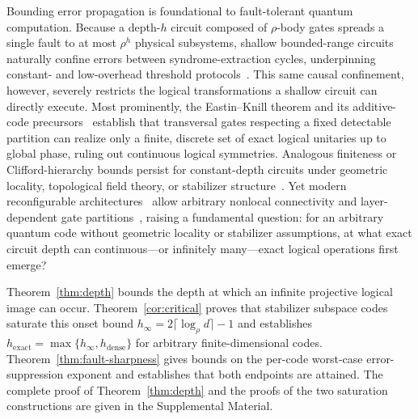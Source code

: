 \documentclass[aps,prl,reprint,notitlepage,nofootinbib,nobibnotes]{revtex4-2}
\begin{document}
Bounding error propagation is foundational to fault-tolerant quantum computation. Because a depth-\(h\) circuit composed of \(\rho\)-body gates spreads a single fault to at most \(\rho^h\) physical subsystems, shallow bounded-range circuits naturally confine errors between syndrome-extraction cycles, underpinning constant- and low-overhead threshold protocols~\cite{Gottesman,BravyiMemory}. This same causal confinement, however, severely restricts the logical transformations a shallow circuit can directly execute. Most prominently, the Eastin--Knill theorem and its additive-code precursors~\cite{Zeng,EK} establish that transversal gates respecting a fixed detectable partition can realize only a finite, discrete set of exact logical unitaries up to global phase, ruling out continuous logical symmetries. Analogous finiteness or Clifford-hierarchy bounds persist for constant-depth circuits under geometric locality, topological field theory, or stabilizer structure~\cite{BK,PY,Beverland,Anderson,JKY,Webster,LuFuLiu}. Yet modern reconfigurable architectures~\cite{Bluvstein2024} allow arbitrary nonlocal connectivity and layer-dependent gate partitions~\cite{Quintavalle,BreuckmannBurton}, raising a fundamental question: for an arbitrary quantum code without geometric locality or stabilizer assumptions, at what exact circuit depth can continuous---or infinitely many---exact logical operations first emerge?

Theorem~\ref{thm:depth} bounds the depth at which an infinite projective logical image can occur. Theorem~\ref{cor:critical} proves that stabilizer subspace codes saturate this onset bound \(h_\infty=2\lceil\log_\rho d\rceil-1\) and establishes \(h_{\mathrm{exact}}=\max\{h_\infty,h_{\mathrm{dense}}\}\) for arbitrary finite-dimensional codes. Theorem~\ref{thm:fault-sharpness} gives bounds on the per-code worst-case error-suppression exponent and establishes that both endpoints are attained. The complete proof of Theorem~\ref{thm:depth} and the proofs of the two saturation constructions are given in the Supplemental Material.
\end{document}
